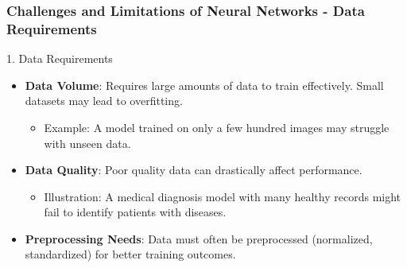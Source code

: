 \documentclass[aspectratio=169]{beamer}
\begin{document}
\begin{frame}[fragile]
    \frametitle{Challenges and Limitations of Neural Networks - Data Requirements}
    \begin{block}{1. Data Requirements}
        \begin{itemize}
            \item \textbf{Data Volume}: Requires large amounts of data to train effectively. Small datasets may lead to overfitting.
                \begin{itemize}
                    \item Example: A model trained on only a few hundred images may struggle with unseen data.
                \end{itemize}
            \item \textbf{Data Quality}: Poor quality data can drastically affect performance.
                \begin{itemize}
                    \item Illustration: A medical diagnosis model with many healthy records might fail to identify patients with diseases.
                \end{itemize}
            \item \textbf{Preprocessing Needs}: Data must often be preprocessed (normalized, standardized) for better training outcomes.
        \end{itemize}
    \end{block}
\end{frame}
\end{document}
